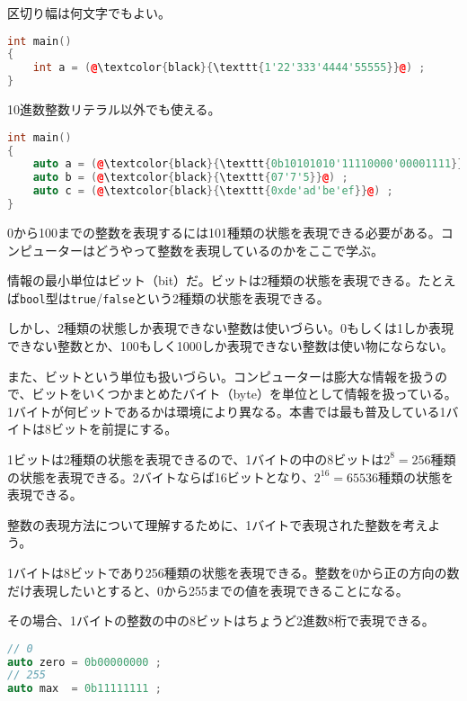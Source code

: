 区切り幅は何文字でもよい。

\begin{lstlisting}[language={C++}]
int main()
{
    int a = (@\textcolor{black}{\texttt{1'22'333'4444'55555}}@) ;
}
\end{lstlisting}

10進数整数リテラル以外でも使える。

\begin{lstlisting}[language={C++}]
int main()
{
    auto a = (@\textcolor{black}{\texttt{0b10101010'11110000'00001111}}@) ;
    auto b = (@\textcolor{black}{\texttt{07'7'5}}@) ;
    auto c = (@\textcolor{black}{\texttt{0xde'ad'be'ef}}@) ;
}
\end{lstlisting}



0から100までの整数を表現するには101種類の状態を表現できる必要がある。コンピューターはどうやって整数を表現しているのかをここで学ぶ。

情報の最小単位はビット（bit）だ。ビットは2種類の状態を表現できる。たとえば\texttt{bool}型は\texttt{true}/\texttt{false}という2種類の状態を表現できる。

しかし、2種類の状態しか表現できない整数は使いづらい。0もしくは1しか表現できない整数とか、100もしく1000しか表現できない整数は使い物にならない。

また、ビットという単位も扱いづらい。コンピューターは膨大な情報を扱うので、ビットをいくつかまとめたバイト（byte）を単位として情報を扱っている。1バイトが何ビットであるかは環境により異なる。本書では最も普及している1バイトは8ビットを前提にする。

1ビットは2種類の状態を表現できるので、1バイトの中の8ビットは\(2^8 = 256\)種類の状態を表現できる。2バイトならば16ビットとなり、\(2^{16} = 65536\)種類の状態を表現できる。


整数の表現方法について理解するために、1バイトで表現された整数を考えよう。

1バイトは8ビットであり256種類の状態を表現できる。整数を0から正の方向の数だけ表現したいとすると、0から255までの値を表現できることになる。

その場合、1バイトの整数の中の8ビットはちょうど2進数8桁で表現できる。

\begin{lstlisting}[language={C++}]
// 0
auto zero = 0b00000000 ;
// 255
auto max  = 0b11111111 ;
\end{lstlisting}

